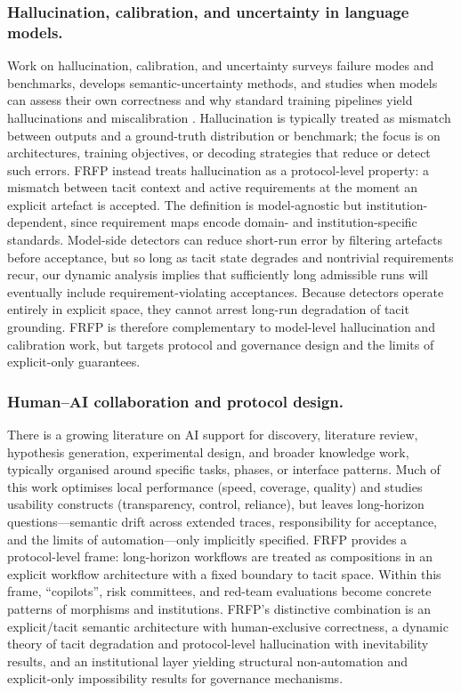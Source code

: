 \documentclass[preprints,accept]{Definitions/mdpi}
\theoremstyle{definition}
\begin{document}
\subsubsection{Hallucination, calibration, and uncertainty in language models.}
Work on hallucination, calibration, and uncertainty surveys failure modes and benchmarks, develops semantic-uncertainty methods, and studies when models can assess their own correctness and why standard training pipelines yield hallucinations and miscalibration \cite{Zhang2023Siren,Huang2025HallucinationSurvey}. Hallucination is typically treated as mismatch between outputs and a ground-truth distribution or benchmark; the focus is on architectures, training objectives, or decoding strategies that reduce or detect such errors. FRFP instead treats hallucination as a protocol-level property: a mismatch between tacit context and active requirements at the moment an explicit artefact is accepted. The definition is model-agnostic but institution-dependent, since requirement maps encode domain- and institution-specific standards. Model-side detectors can reduce short-run error by filtering artefacts before acceptance, but so long as tacit state degrades and nontrivial requirements recur, our dynamic analysis implies that sufficiently long admissible runs will eventually include requirement-violating acceptances. Because detectors operate entirely in explicit space, they cannot arrest long-run degradation of tacit grounding. FRFP is therefore complementary to model-level hallucination and calibration work, but targets protocol and governance design and the limits of explicit-only guarantees.

\subsubsection{Human--AI collaboration and protocol design.}
There is a growing literature on AI support for discovery, literature review, hypothesis generation, experimental design, and broader knowledge work, typically organised around specific tasks, phases, or interface patterns. Much of this work optimises local performance (speed, coverage, quality) and studies usability constructs (transparency, control, reliance), but leaves long-horizon questions---semantic drift across extended traces, responsibility for acceptance, and the limits of automation---only implicitly specified. FRFP provides a protocol-level frame: long-horizon workflows are treated as compositions in an explicit workflow architecture with a fixed boundary to tacit space. Within this frame, ``copilots'', risk committees, and red-team evaluations become concrete patterns of morphisms and institutions. FRFP's distinctive combination is an explicit/tacit semantic architecture with human-exclusive correctness, a dynamic theory of tacit degradation and protocol-level hallucination with inevitability results, and an institutional layer yielding structural non-automation and explicit-only impossibility results for governance mechanisms.
\end{document}
